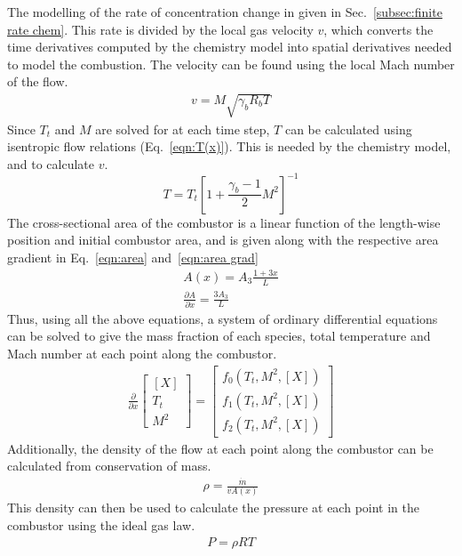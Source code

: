 \documentclass[a4paper]{article}
\begin{document}
The modelling of the rate of concentration change in given in Sec.~\ref{subsec:finite rate chem}. This rate is divided by the local gas velocity \(v\), which converts the time derivatives computed by the chemistry model into spatial derivatives needed to model the combustion. The velocity can be found using the local Mach number of the flow.
\begin{align}\label{eqn:v(x)}
    v = M \sqrt{\gamma_b R_b T}
\end{align}
Since \(T_t\) and \(M\) are solved for at each time step, \(T\) can be calculated using isentropic flow relations (Eq.~\ref{eqn:T(x)}). This is needed by the chemistry model, and to calculate \(v\).
\begin{equation}\label{eqn:T(x)}
    T = T_t \left[ 1 + \frac{\gamma_b-1}{2}M^2 \right]^{-1}
\end{equation}
The cross-sectional area of the combustor is a linear function of the length-wise position and initial combustor area, and is given along with the respective area gradient in Eq.~\ref{eqn:area} and~\ref{eqn:area grad}
\begin{gather} 
    \label{eqn:area}
    A(x) = A_3 \frac{1 + 3x}{L} \\
    \label{eqn:area grad}
    \frac{\partial A}{\partial x} = \frac{3A_3}{L}
\end{gather}
Thus, using all the above equations, a system of ordinary differential equations can be solved to give the mass fraction of each species, total temperature and Mach number at each point along the combustor.
\begin{align}
    \frac{\partial}{\partial x} 
    \begin{bmatrix}
    \left[ X \right] \\
    T_t\\
    M^2
    \end{bmatrix}
    =
    \begin{bmatrix}
        f_0 \left(T_t, M^2, \left[ X \right]\right)\\
        f_1 \left(T_t, M^2, \left[ X \right]\right)\\
        f_2 \left(T_t, M^2, \left[ X \right]\right)
    \end{bmatrix}
\end{align}
Additionally, the density of the flow at each point along the combustor can be calculated from conservation of mass.
\begin{align}
    \rho = \frac{\dot{m}}{v A(x)}
\end{align}
This density can then be used to calculate the pressure at each point in the combustor using the ideal gas law.
\begin{align}
    P = \rho R T
\end{align}
\end{document}
